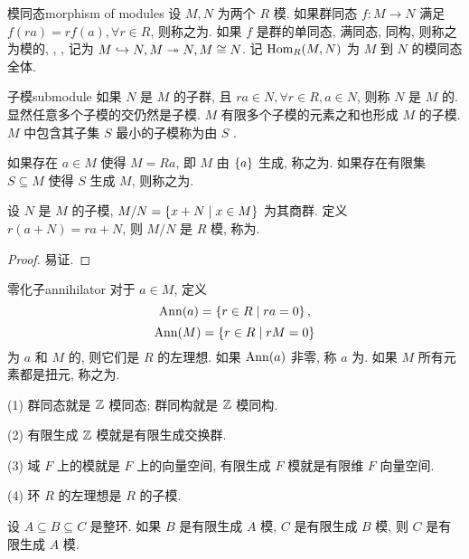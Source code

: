 \begin{definition}{模同态}{morphism of modules}
设 $M,N$ 为两个 $R$ 模. 如果群同态 $f:M\to N$ 满足 $f(ra)=rf(a),\forall r\in R$, 则称之为. 如果 $f$ 是群的单同态, 满同态, 同构, 则称之为模的, , , 记为 $M\hookrightarrow N, M\twoheadrightarrow N, M\cong N$. 记 ${\mathrm{Hom}}_R(M,N)$ 为 $M$ 到 $N$ 的模同态全体.
\end{definition}

\begin{definition}{子模}{submodule}
如果 $N$ 是 $M$ 的子群, 且 $ra\in N,\forall r\in R,a\in N$, 则称 $N$ 是 $M$ 的. 显然任意多个子模的交仍然是子模. $M$ 有限多个子模的元素之和也形成 $M$ 的子模. $M$ 中包含其子集 $S$ 最小的子模称为由 $S$ .

如果存在 $a\in M$ 使得 $M=Ra$, 即 $M$ 由 $\left\{a\right\}$ 生成, 称之为. 如果存在有限集 $S\subseteq M$ 使得 $S$ 生成 $M$, 则称之为.
\end{definition}

\begin{proposition}{}{}
设 $N$ 是 $M$ 的子模, $M/N=\left\{x+N\mid x\in M\right\}$ 为其商群. 定义 $r(a+N)=ra+N$, 则 $M/N$ 是 $R$ 模, 称为.
\end{proposition}
\begin{proof}
易证.
\end{proof}

\begin{definition}{零化子}{annihilator}
对于 $a\in M$, 定义 
  \[{\mathrm{Ann}}(a)=\left\{r\in R\mid ra=0\right\},\]
  \[{\mathrm{Ann}}(M)=\left\{r\in R\mid rM=0\right\}\]
为 $a$ 和 $M$ 的, 则它们是 $R$ 的左理想. 如果 ${\mathrm{Ann}}(a)$ 非零, 称 $a$ 为. 如果 $M$ 所有元素都是扭元, 称之为.
\end{definition}

\begin{example}
(1) 群同态就是 ${\mathbb{Z}}$ 模同态; 群同构就是 ${\mathbb{Z}}$ 模同构.

(2) 有限生成 ${\mathbb{Z}}$ 模就是有限生成交换群.

(3) 域 $F$ 上的模就是 $F$ 上的向量空间, 有限生成 $F$ 模就是有限维 $F$ 向量空间.

(4) 环 $R$ 的左理想是 $R$ 的子模.
\end{example}

\begin{exercise}
设 $A\subseteq B\subseteq C$ 是整环. 如果 $B$ 是有限生成 $A$ 模, $C$ 是有限生成 $B$ 模, 则 $C$ 是有限生成 $A$ 模.
\end{exercise}

